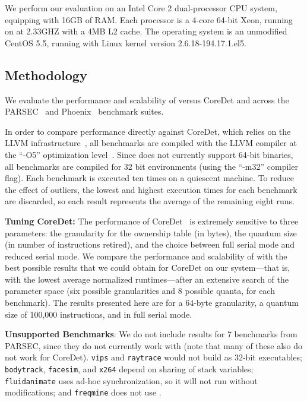 \label{sec:dthreadsevaluation}

We perform our evaluation on an Intel Core 2 dual-processor CPU system, equipping with 16GB of RAM. Each processor is a 4-core 64-bit Xeon, running on at 2.33GHZ with a 4MB L2 cache. The operating system is an unmodified CentOS 5.5, running with Linux kernel version 2.6.18-194.17.1.el5.

\subsection{Methodology}

We evaluate the performance and scalability of \dthreads{} versus CoreDet and \pthreads{} across the PARSEC~\cite{parsec} and Phoenix~\cite{phoenix-hpca} benchmark suites.  

In order to compare performance directly against CoreDet, which relies on the LLVM infrastructure~\cite{LLVM:CGO04}, all benchmarks are compiled with the LLVM compiler at the ``-O5'' optimization level~\cite{LLVM:CGO04}. Since \dthreads{} does not currently support 64-bit binaries, all benchmarks are compiled for 32 bit environments (using the ``-m32'' compiler flag). Each benchmark is executed ten times on a quiescent machine. To reduce the effect of outliers, the lowest and highest execution times for each benchmark are discarded,
so each result represents the average of the remaining eight runs.

\textbf{Tuning CoreDet:} 
The performance of CoreDet~\cite{Bergan:2010:CCR:1736020.1736029} is extremely sensitive to three parameters: the granularity for the ownership table (in bytes), the quantum size (in number of instructions retired), and the choice between full serial mode and reduced serial mode. We compare the performance and scalability of \dthreads{} with the best possible results that we could obtain for CoreDet on our system---that is, with the lowest average normalized
runtimes---after an extensive search of the parameter space (six possible granularities and 8 possible quanta, for each benchmark). The results presented here are for a 64-byte granularity, a quantum size of 100,000 instructions, and in full serial mode.

\textbf{Unsupported Benchmarks}: We do not include results for 7 benchmarks from PARSEC, since they do not currently work with \dthreads{} (note that many of these also do not work for CoreDet). \texttt{vips} and \texttt{raytrace} would not build as 32-bit executables; \texttt{bodytrack}, \texttt{facesim}, and \texttt{x264} depend on sharing of stack variables;
\texttt{fluidanimate} uses ad-hoc synchronization, so it will not run without modifications; and \texttt{freqmine} does not use \pthreads{}.

